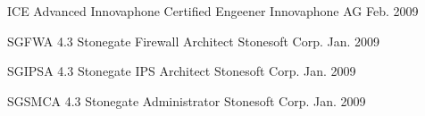 \begin{cvhonors}

\cvhonor
{ICE Advanced} %
{Innovaphone Certified Engeener} %
{Innovaphone AG} %
{Feb. 2009} %


\cvhonor
{SGFWA 4.3} %
{Stonegate Firewall Architect} %
{Stonesoft Corp.} %
{Jan. 2009} %


\cvhonor
{SGIPSA 4.3} %
{Stonegate IPS Architect} %
{Stonesoft Corp.} %
{Jan. 2009} %


\cvhonor
{SGSMCA 4.3} %
{Stonegate Administrator} %
{Stonesoft Corp.} %
{Jan. 2009} %



\end{cvhonors}




